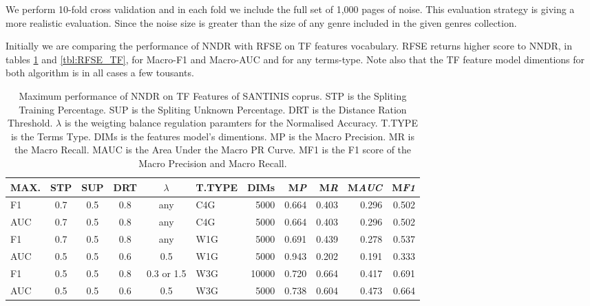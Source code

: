 \documentclass[runningheads]{llncs}
\begin{document}
We perform  10-fold cross validation and in each fold we include the full set of 1,000 pages of noise. This evaluation strategy is giving a more realistic evaluation. Since the noise size is greater than the size of any genre included in the given genres collection.

Initially we are comparing the performance of NNDR with RFSE on TF features vocabulary. RFSE returns higher score to NNDR, in tables \ref{tbl:NNDR_TF} and \ref{tbl:RFSE_TF}, for Macro-F1 and Macro-AUC and for any terms-type. Note also that the TF feature model dimentions for both algorithm is in all cases a few tousants.

\pagebreak

\begin{table}
\center
\begin{tabular}{|l|cccc|lr|rrrr|}
\hline
MAX. & STP & SUP & DRT & $\lambda$ & T.TYPE & DIMs & M\emph{P} & M\emph{R} & M\emph{AUC} & M\emph{F1} \\
\hline
F1 & 0.7 & 0.5 & 0.8 & any & C4G & 5000 & 0.664 & 0.403 & 0.296 & 0.502 \\
AUC & 0.7 & 0.5 & 0.8 & any & C4G & 5000 & 0.664 & 0.403 & 0.296 & 0.502 \\
F1 & 0.7 & 0.5 & 0.8 & any & W1G & 5000 & 0.691 & 0.439 & 0.278 & 0.537 \\
AUC & 0.5 & 0.5 & 0.6 & 0.5 & W1G & 5000 & 0.943 & 0.202 & 0.191 & 0.333 \\
F1 & 0.5 & 0.5 & 0.8 & 0.3 or 1.5 & W3G & 10000 & 0.720 & 0.664 & 0.417 & 0.691 \\
AUC & 0.5 & 0.5 & 0.6 & 0.5 & W3G & 5000 & 0.738 & 0.604 & 0.473 & 0.664 \\
\hline
\end{tabular}
\caption {Maximum performance of NNDR on TF Features of SANTINIS coprus. STP is the Spliting Training Percentage. SUP is the Spliting Unknown Percentage. DRT is the Distance Ration Threshold. $\lambda$ is the weigting balance regulation paramters for the Normalised Accuracy. T.TYPE is the Terms Type. DIMs is the features model's dimentions. MP is the Macro Precision. MR is the Macro Recall. MAUC is the Area Under the Macro PR Curve. MF1 is the F1 score of the Macro Precision and Macro Recall.}
\label{tbl:NNDR_TF}
\vspace{-15mm}
\end{table}
\end{document}
